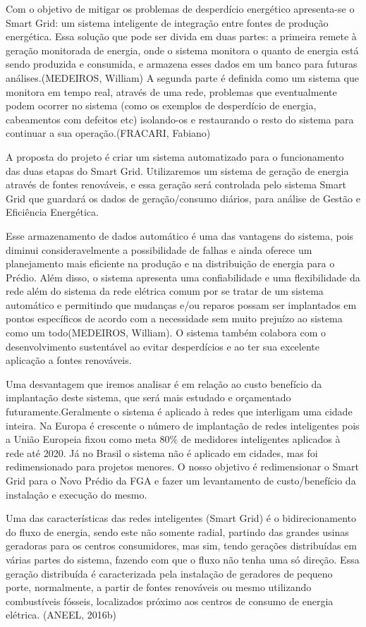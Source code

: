 Com o objetivo de mitigar os problemas de desperdício energético apresenta-se o Smart Grid: um sistema inteligente de integração entre fontes de produção energética. Essa solução que pode ser divida em duas partes: a primeira remete à geração monitorada de energia, onde o sistema monitora o quanto de energia está sendo produzida e consumida, e armazena esses dados em um banco para futuras análises.(MEDEIROS, William) A segunda parte é definida como um sistema que monitora em tempo real, através de uma rede, problemas que eventualmente podem ocorrer no sistema (como os exemplos de desperdício de energia, cabeamentos com defeitos etc) isolando-os e restaurando o resto do sistema para continuar a sua operação.(FRACARI, Fabiano)

A proposta do projeto é criar um sistema automatizado para o funcionamento das duas etapas do Smart Grid. Utilizaremos um sistema de geração de energia através de fontes renováveis, e essa geração será controlada pelo sistema Smart Grid que guardará os dados de geração/consumo diários, para análise de Gestão e Eficiência Energética.

Esse armazenamento de dados automático é uma das vantagens do sistema, pois diminui consideravelmente a possibilidade de falhas e ainda oferece um planejamento mais eficiente na produção e na distribuição de energia para o Prédio. Além disso, o sistema apresenta uma confiabilidade e uma flexibilidade da rede além do sistema da rede elétrica comum por se tratar de um sistema automático e permitindo que mudanças e/ou reparos possam ser implantados em pontos específicos de acordo com a necessidade sem muito prejuízo ao sistema como um todo(MEDEIROS, William). O sistema também colabora com o desenvolvimento sustentável ao evitar desperdícios e ao ter sua excelente aplicação a fontes renováveis.

Uma desvantagem que iremos analisar é em relação ao custo benefício da implantação deste sistema, que será mais estudado e orçamentado futuramente.Geralmente o sistema é aplicado à redes que interligam uma cidade inteira. Na Europa é crescente o número de implantação de redes inteligentes pois a União Europeia fixou como meta 80\% de medidores inteligentes aplicados à rede até 2020. Já no Brasil o sistema não é aplicado em cidades, mas foi redimensionado para projetos menores. O nosso objetivo é redimensionar o Smart Grid para o Novo Prédio da FGA e fazer um levantamento de custo/benefício da instalação e execução do mesmo.

Uma das características das redes inteligentes (Smart Grid) é o bidirecionamento do fluxo de energia, sendo este não somente radial, partindo das grandes usinas geradoras para os centros consumidores, mas sim, tendo gerações distribuídas em várias partes do sistema, fazendo com que o fluxo não tenha uma só direção. Essa geração distribuída é caracterizada pela instalação de geradores de pequeno porte, normalmente, a partir de fontes renováveis ou mesmo utilizando combustíveis fósseis, localizados próximo aos centros de consumo de energia elétrica. (ANEEL, 2016b)


